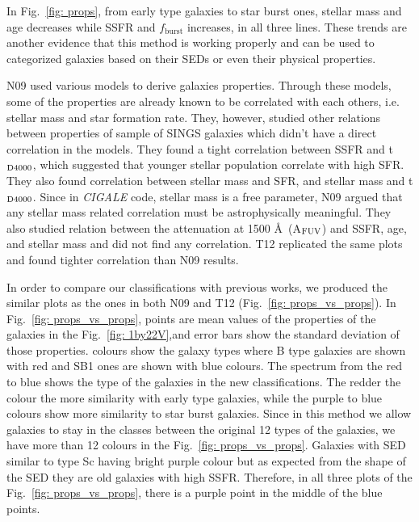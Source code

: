         In Fig.~\ref{fig: props}, from early type galaxies to star burst ones, stellar mass and age decreases while SSFR and $f_\mathrm{burst}$ increases, in all three lines. 
        These trends are another evidence that this method is working properly and can be used to categorized galaxies based on their SEDs or even their physical properties.
        
        N09 used various models to derive galaxies properties.
        Through these models, some of the properties are already known to be correlated with each others, i.e. stellar mass and star formation rate.
        They, however, studied other relations between properties of sample of SINGS galaxies which didn't have a direct correlation in the models.
        They found a tight correlation between SSFR and t$_{\rm {D4000}}$, which suggested that younger stellar population correlate with high SFR.
        They also found correlation between stellar mass and SFR, and stellar mass and t$_{\rm {D4000}}$.
        Since in {\em CIGALE} code, stellar mass is a free parameter, N09 argued that any stellar mass related correlation must be astrophysically meaningful. 
        They also studied relation between the attenuation at 1500 \AA~(A$_{\rm {FUV}}$) and SSFR, age, and stellar mass and did not find any correlation.
        T12 replicated the same plots and found tighter correlation than N09 results.  
        
        In order to compare our classifications with previous works, we produced the similar plots as the ones in both N09 and T12 (Fig.~\ref{fig: props_vs_props}).
        In Fig.~\ref{fig: props_vs_props}, points are mean values of the properties of the galaxies in the Fig.~\ref{fig: 1by22V},and error bars show the standard deviation of those properties.
        colours show the galaxy types where B type galaxies are shown with red and SB1 ones are shown with blue colours.
        The spectrum from the red to blue shows the type of the galaxies in the new classifications. 
        The redder the colour the more similarity with early type galaxies, while the purple to blue colours show more similarity to star burst galaxies.
        Since in this method we allow galaxies to stay in the classes between the original 12 types of the galaxies, we have more than 12 colours in the Fig.~\ref{fig: props_vs_props}.
        Galaxies with SED similar to type Sc having bright purple colour but as expected from the shape of the SED they are old galaxies with high SSFR.
        Therefore, in all three plots of the Fig.~\ref{fig: props_vs_props}, there is a purple point in the middle of the blue points.
        
